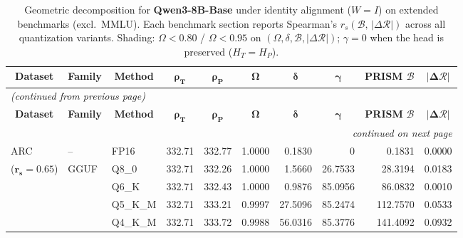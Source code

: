 \begingroup
\small
\setlength{\tabcolsep}{4pt}
\renewcommand{\arraystretch}{1.05}
\setlength{\LTcapwidth}{\textwidth}
\begin{longtable}{ll l rrrrrrr}
\caption{Geometric decomposition for \textbf{Qwen3-8B-Base} under identity alignment ($W{=}I$) on extended benchmarks (excl.\ MMLU). Each benchmark section reports Spearman's $r_s(\mathcal{B},\,|\Delta\mathcal{R}|)$ across all quantization variants. Shading: \colorbox{red!35}{$\Omega{<}0.80$} / \colorbox{red!18}{$\Omega{<}0.95$} on $(\Omega,\delta,\mathcal{B},|\Delta\mathcal{R}|)$; \colorbox{cyan!12}{$\gamma{=}0$} when the head is preserved ($H_T{=}H_P$).}\label{tab:qwen_decomposition_ext_bound}\\
\toprule
\multicolumn{1}{c}{\textbf{Dataset}} & \multicolumn{1}{c}{\textbf{Family}} & \multicolumn{1}{c}{\textbf{Method}} & \multicolumn{1}{c}{$\boldsymbol{\rho_T}$} & \multicolumn{1}{c}{$\boldsymbol{\rho_P}$} & \multicolumn{1}{c}{$\boldsymbol{\Omega}$} & \multicolumn{1}{c}{$\boldsymbol{\delta}$} & \multicolumn{1}{c}{$\boldsymbol{\gamma}$} & \multicolumn{1}{c}{\textbf{PRISM} $\boldsymbol{\mathcal{B}}$} & \multicolumn{1}{c}{$\boldsymbol{|\Delta\mathcal{R}|}$} \\
\midrule
\endfirsthead
\multicolumn{10}{l}{\small\itshape (continued from previous page)}\\
\toprule
\multicolumn{1}{c}{\textbf{Dataset}} & \multicolumn{1}{c}{\textbf{Family}} & \multicolumn{1}{c}{\textbf{Method}} & \multicolumn{1}{c}{$\boldsymbol{\rho_T}$} & \multicolumn{1}{c}{$\boldsymbol{\rho_P}$} & \multicolumn{1}{c}{$\boldsymbol{\Omega}$} & \multicolumn{1}{c}{$\boldsymbol{\delta}$} & \multicolumn{1}{c}{$\boldsymbol{\gamma}$} & \multicolumn{1}{c}{\textbf{PRISM} $\boldsymbol{\mathcal{B}}$} & \multicolumn{1}{c}{$\boldsymbol{|\Delta\mathcal{R}|}$} \\
\midrule
\endhead
\midrule
\multicolumn{10}{r}{\small\itshape continued on next page}\\
\endfoot
\bottomrule
\endlastfoot
ARC & -- & FP16 & 332.71 & 332.77 & 1.0000 & 0.1830 & \cellcolor{cyan!12} $0$ & 0.1831 & 0.0000 \\
{\small ($\mathbf{r_s{=}0.65}$)} & GGUF & Q8\_0 & 332.71 & 332.26 & 1.0000 & 1.5660 & 26.7533 & 28.3194 & 0.0183 \\
 &  & Q6\_K & 332.71 & 332.43 & 1.0000 & 0.9876 & 85.0956 & 86.0832 & 0.0010 \\
 &  & Q5\_K\_M & 332.71 & 333.21 & 0.9997 & 27.5096 & 85.2474 & 112.7570 & 0.0533 \\
 &  & Q4\_K\_M & 332.71 & 333.72 & 0.9988 & 56.0316 & 85.3776 & 141.4092 & 0.0932 \\

\end{longtable}
